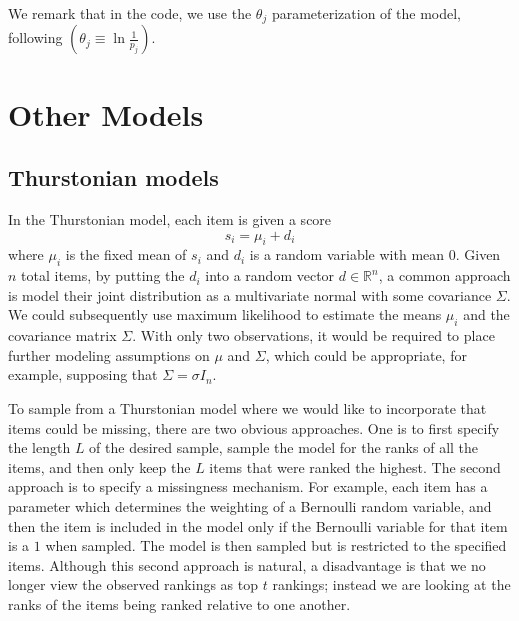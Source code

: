 \documentclass[10pt]{article}
\newcommand\bl{\left(}
\newcommand\br{\right)}
\begin{document}
We remark that in the code, we use the $\theta_j$ parameterization of the model, following \cite{MBao} $\bl \theta_j \equiv \ln{\frac{1}{p_j}} \br$.
\section{Other Models}


\subsection{Thurstonian models}
\label{sec:thurst}
In the Thurstonian model, each item is given a score 
\begin{equation}
    s_i = \mu_i + d_i
\end{equation}
where $\mu_i$ is the fixed mean of $s_i$ and $d_i$ is a random variable with mean $0$. Given $n$ total items, by putting the $d_i$ into a random vector $d \in \mathbb{R}^n$, a common approach is model their joint distribution as a multivariate normal with some covariance $\Sigma$. We could subsequently use maximum likelihood to estimate the means $\mu_i$ and the covariance matrix $\Sigma$. With only two observations, it would be required to place further modeling assumptions on $\mu$ and $\Sigma$, which could be appropriate, for example, supposing that $\Sigma = \sigma I_n$.

To sample from a Thurstonian model where we would like to incorporate that items could be missing, there are two obvious approaches. One is to first specify the length $L$ of the desired sample, sample the model for the ranks of all the items, and then only keep the $L$ items that were ranked the highest. The second approach is to specify a missingness mechanism. For example, each item has a parameter which determines the weighting of a Bernoulli random variable, and then the item is included in the model only if the Bernoulli variable for that item is a $1$ when sampled. The model is then sampled but is restricted to the specified items. Although this second approach is natural, a disadvantage is that we no longer view the observed rankings as top $t$ rankings; instead we are looking at the ranks of the items being ranked relative to one another. %
\end{document}
